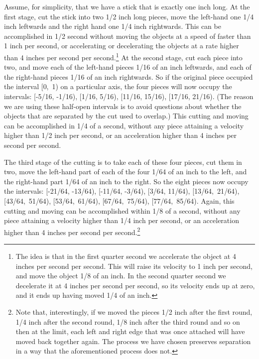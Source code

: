 \documentclass[
  11pt,
  letterpaper,
  DIV=11,
  numbers=noendperiod,
  twoside]{scrartcl}
\begin{document}
Assume, for simplicity, that we have a stick that is exactly one inch
long. At the first stage, cut the stick into two 1/2 inch long pieces,
move the left-hand one 1/4 inch leftwards and the right hand one 1/4
inch rightwards. This can be accomplished in 1/2 second without moving
the objects at a speed of faster than 1 inch per second, or accelerating
or decelerating the objects at a rate higher than 4 inches per second
per second.\footnote{The idea is that in the first quarter second we
  accelerate the object at 4 inches per second per second. This will
  raise its velocity to 1 inch per second, and move the object 1/8 of an
  inch. In the second quarter second we decelerate it at 4 inches per
  second per second, so its velocity ends up at zero, and it ends up
  having moved 1/4 of an inch.} At the second stage, cut each piece into
two, and move each of the left-hand pieces 1/16 of an inch leftwards,
and each of the right-hand pieces 1/16 of an inch rightwards. So if the
original piece occupied the interval {[}0,~1) on a particular axis, the
four pieces will now occupy the intervals: {[}-5/16, -1/16), {[}1/16,
5/16), {[}11/16, 15/16), {[}17/16, 21/16). (The reason we are using
these half-open intervals is to avoid questions about whether the
objects that are separated by the cut used to overlap.) This cutting and
moving can be accomplished in 1/4 of a second, without any piece
attaining a velocity higher than 1/2 inch per second, or an acceleration
higher than 4 inches per second per second.

The third stage of the cutting is to take each of these four pieces, cut
them in two, move the left-hand part of each of the four 1/64 of an inch
to the left, and the right-hand part 1/64 of an inch to the right. So
the eight pieces now occupy the intervals: {[}-21/64, -13/64),
{[}-11/64, -3/64), {[}3/64, 11/64), {[}13/64,~21/64), {[}43/64,~51/64),
{[}53/64,~61/64), {[}67/64,~75/64), {[}77/64,~85/64). Again, this
cutting and moving can be accomplished within 1/8 of a second, without
any piece attaining a velocity higher than 1/4 inch per second, or an
acceleration higher than 4 inches per second per second.\footnote{Note
  that, interestingly, if we moved the pieces 1/2 inch after the first
  round, 1/4 inch after the second round, 1/8 inch after the third round
  and so on then at the limit, each left and right edge that was once
  attached will have moved back together again. The process we have
  chosen preserves separation in a way that the aforementioned process
  does not.}
\end{document}

